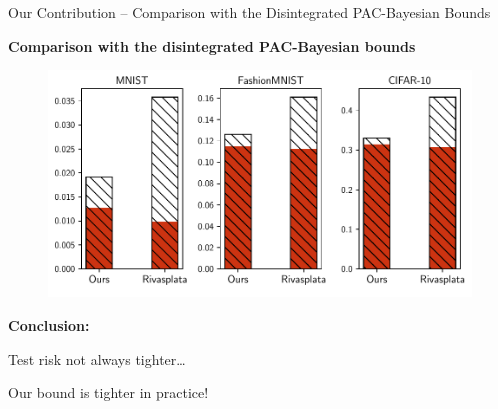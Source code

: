 \documentclass{slides}
\begin{document}
\begin{xframe}{Our Contribution -- {\small Comparison with the Disintegrated PAC-Bayesian Bounds}}

\vspace{-0.3cm}

\begin{center}
{\bf Comparison with the disintegrated PAC-Bayesian bounds}
\end{center}

\vspace{-0.2cm}

\begin{minipage}{0.8\linewidth}
\begin{figure}[H]
    \centering
    \includegraphics[width=0.9\linewidth]{figures/comparison_dis_bound_slides.pdf}
\end{figure}
\end{minipage}
\hfill
\begin{minipage}{0.19\linewidth}
\begin{figure}
\hspace{-0.6cm}
\end{figure}
\end{minipage}

{\bf Conclusion:}
\begin{xitemize}
\item[\red{\bf --}] Test risk not always tighter\dots
\item[\green{\bf +}] Our bound is tighter in practice!
\end{xitemize}

\vfill

\end{xframe}

\end{document}
